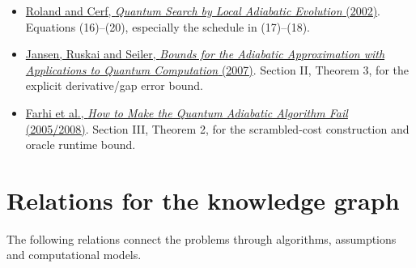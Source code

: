 \documentclass[11pt,a4paper]{article}
\theoremstyle{problemstyle}
\newcommand{\subhead}[1]{\Needspace{4\baselineskip}\par\vspace{5pt}{\bfseries #1\par}\vspace{1pt}}
\newenvironment{algorithmindex}[1]{%
  \begin{itemize}[label=\textbullet,leftmargin=1.3em,labelsep=0.6em,itemsep=4pt,topsep=3pt,parsep=0pt]
  \small
}{\end{itemize}}
\begin{document}
\subhead{Algorithm: Roland--Cerf local adiabatic search}
\begin{algorithmindex}{100}
\item \href{https://arxiv.org/pdf/quant-ph/0107015}{Roland and Cerf, \emph{Quantum Search by Local Adiabatic Evolution} (2002)}. Equations (16)--(20), especially the schedule in (17)--(18).
\item \href{https://arxiv.org/pdf/quant-ph/0603175}{Jansen, Ruskai and Seiler, \emph{Bounds for the Adiabatic Approximation with Applications to Quantum Computation} (2007)}. Section II, Theorem 3, for the explicit derivative/gap error bound.
\item \href{https://arxiv.org/pdf/quant-ph/0512159}{Farhi et al., \emph{How to Make the Quantum Adiabatic Algorithm Fail} (2005/2008)}. Section III, Theorem 2, for the scrambled-cost construction and oracle runtime bound.
\end{algorithmindex}

\clearpage
\section*{Relations for the knowledge graph}
The following relations connect the problems through algorithms, assumptions and computational models.
\end{document}
